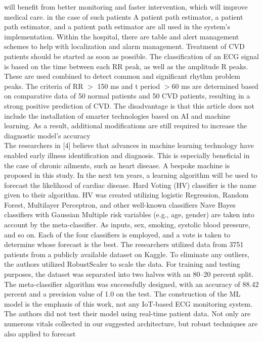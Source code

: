 \documentclass{bmcart}
\begin{document}
will benefit from better monitoring and faster intervention, which will improve
medical care. in the case of such patients A patient path estimator, a patient
path estimator, and a patient path estimator are all used in the system's
implementation.  Within the hospital, there are table and alert management
schemes to help with localization and alarm management. Treatment of CVD
patients should be started as soon as possible. The classification of an ECG
signal is based on the time between each RR peak, as well as the amplitude R
peaks. These are used combined to detect common and significant rhythm problem
peaks. The criteria of RR $>$ 150 ms and t period $>$60 ms are determined based
on comparative data of 50 normal patients and 50 CVD patients, resulting in a
strong positive prediction of CVD. The disadvantage is that this article does
not include the installation of smarter technologies based on AI and machine
learning. As a result, additional modifications are still required to increase
the diagnostic model's accuracy\\
The researchers in [4] believe that advances in machine learning technology have
enabled early illness identification and diagnosis. This is especially
beneficial in the case of chronic ailments, such as heart disease. A bespoke
machine is proposed in this study. In the next ten years, a learning algorithm
will be used to forecast the likelihood of cardiac disease. Hard Voting (HV)
classifier is the name given to their algorithm. HV was created utilizing
logistic Regression, Random Forest, Multilayer Perceptron, and other well-known
classifiers  Nave Bayes classifiers with Gaussian Multiple risk variables (e.g.,
age, gender) are taken into account by the meta-classifier. As inputs, sex,
smoking, systolic blood pressure, and so on. Each of the four classifiers is
employed, and  a vote is taken to determine whose forecast is the best. The
researchers utilized data from 3751 patients from a publicly available dataset
on Kaggle. To eliminate any outliers, the authors utilized RobustScaler to scale
the data. For training and testing purposes, the dataset was separated into two
halves with an 80–20 percent split. The meta-classifier algorithm was
successfully designed, with an accuracy of 88.42 percent and a precision value
of 1.0 on the test. The construction of the ML model is the emphasis of this
work, not any IoT-based ECG monitoring system. The authors did not test their
model using real-time patient data. Not only are numerous vitals collected in
our suggested architecture, but robust techniques are also applied to forecast
\end{document}

